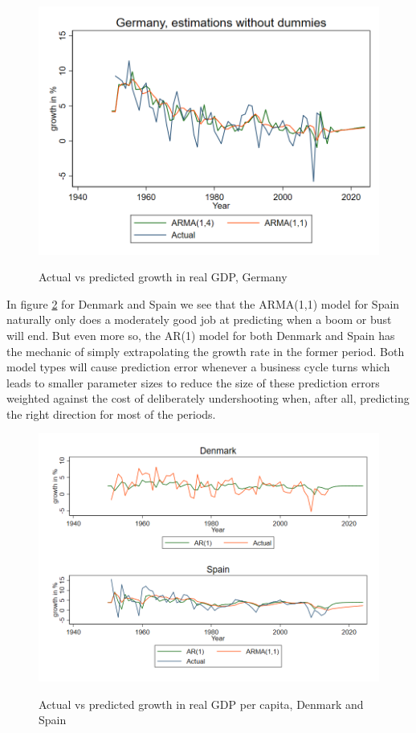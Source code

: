 \begin{figure}[H]
  \caption{Actual vs predicted growth in real GDP, Germany}
  \includegraphics[width= \textwidth]{03_figures/fig23f2}
  \label{fig:23f2}
  \vspace{-1cm}
\end{figure}
In figure \ref{fig:23f3} for Denmark and Spain we see that the ARMA(1,1) model for Spain naturally only does a moderately good job at predicting when a boom or bust will end. But even more so, the AR(1) model for both Denmark and Spain has the mechanic of simply extrapolating the growth rate in the former period. Both model types will cause prediction error whenever a business cycle turns which leads to smaller parameter sizes to reduce the size of these prediction errors weighted against the cost of deliberately undershooting when, after all, predicting the right direction for most of the periods.
\begin{figure}[H]
  \caption{Actual vs predicted growth in real GDP per capita, Denmark and Spain}
  \includegraphics[width= \textwidth]{03_figures/fig23f3}
  \label{fig:23f3}
  \vspace{-1cm}
\end{figure}
